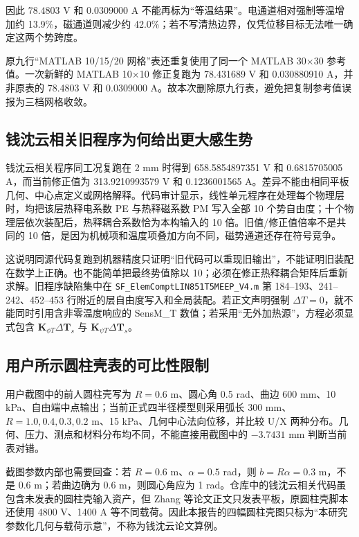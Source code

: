 \documentclass[UTF8,fontset=windows,11pt,a4paper]{ctexart}
\begin{document}
因此 $78.4803$ V 和 $0.0309000$ A 不能再标为“等温结果”。电通道相对强制等温增加约 13.9\%，磁通道则减少约 42.0\%；若不写清热边界，仅凭位移目标无法唯一确定这两个势跨度。

原九行“MATLAB 10/15/20 网格”表还重复使用了同一个 MATLAB 30$\times$30 参考值。一次新鲜的 MATLAB 10$\times$10 修正复跑为 78.431689 V 和 0.030880910 A，并非原表的 78.4803 V 和 0.0309000 A。故本次删除原九行表，避免把复制参考值误报为三档网格收敛。

\subsection{钱沈云相关旧程序为何给出更大感生势}

钱沈云相关程序同工况复跑在 2 mm 时得到 658.5854897351 V 和 0.6815705005 A，而当前修正值为 313.9210993579 V 和 0.1236001565 A。差异不能由相同平板几何、中心点定义或网格解释。代码审计显示，线性单元程序在处理每个物理层时，均把该层热释电系数 PE 与热释磁系数 PM 写入全部 10 个势自由度；十个物理层依次装配后，热释耦合系数恰为本构输入的 10 倍。旧值/修正值倍率不是共同的 10 倍，是因为机械项和温度项叠加方向不同，磁势通道还存在符号竞争。

这说明同源代码复跑到机器精度只证明“旧代码可以重现旧输出”，不能证明旧装配在数学上正确。也不能简单把最终势值除以 10；必须在修正热释耦合矩阵后重新求解。旧程序缺陷集中在 \texttt{SF\_ElemComptLIN851T5MEEP\_V4.m} 第 184--193、241--242、452--453 行附近的层自由度写入和全局装配。若正文声明强制 $\Delta T=0$，就不能同时引用含非零温度响应的 SensM\_T 数值；若采用“无外加热源”，方程必须显式包含 $\mathbf K_{\phi T}\Delta\mathbf T_s$ 与 $\mathbf K_{\psi T}\Delta\mathbf T_s$。

\subsection{用户所示圆柱壳表的可比性限制}

用户截图中的前人圆柱壳写为 $R=0.6$ m、圆心角 0.5 rad、曲边 600 mm、10 kPa、自由端中点输出；当前正式四半径模型则采用弧长 300 mm、$R=1.0,0.4,0.3,0.2$ m、15 kPa、几何中心法向位移，并比较 U/X 两种分布。几何、压力、测点和材料分布均不同，不能直接用截图中的 $-3.7431$ mm 判断当前表对错。

截图参数内部也需要回查：若 $R=0.6$ m、$\alpha=0.5$ rad，则 $b=R\alpha=0.3$ m，不是 0.6 m；若曲边确为 0.6 m，则圆心角应为 1 rad。仓库中的钱沈云相关代码虽包含未发表的圆柱壳输入资产，但 Zhang 等论文正文只发表平板，原圆柱壳脚本还使用 4800 V、1400 A 等不同载荷。因此本报告的四幅圆柱壳图只标为“本研究参数化几何与载荷示意”，不称为钱沈云论文算例。
\end{document}
